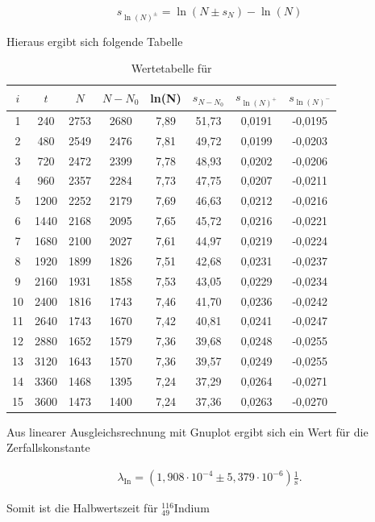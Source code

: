 \begin{equation}
 s_{\ln(N)^{\pm}} = \ln(N\pm s_N)-\ln(N)
\end{equation}

Hieraus ergibt sich folgende Tabelle

\renewcommand{\arraystretch}{1.25}
\begin{table}[h]
 \begin{tabular}{c|c|c|c|c|c|c|c}
 $i$ & $t$ & $N$ & $N-N_0$ & ln(N) & $s_{N-N_0}$ & $s_{\ln(N)^+}$ & $s_{\ln(N)^-}$ \\
 \hline
1&	240&	2753&	2680&	7,89&	51,73&	0,0191&	-0,0195\\
2&	480&	2549&	2476&	7,81&	49,72&	0,0199&	-0,0203\\
3&	720&	2472&	2399&	7,78&	48,93&	0,0202&	-0,0206\\
4&	960&	2357&	2284&	7,73&	47,75&	0,0207&	-0,0211\\
5&	1200&	2252&	2179&	7,69&	46,63&	0,0212&	-0,0216\\
6&	1440&	2168&	2095&	7,65&	45,72&	0,0216&	-0,0221\\
7&	1680&	2100&	2027&	7,61&	44,97&	0,0219&	-0,0224\\
8&	1920&	1899&	1826&	7,51&	42,68&	0,0231&	-0,0237\\
9&	2160&	1931&	1858&	7,53&	43,05&	0,0229&	-0,0234\\
10&	2400&	1816&	1743&	7,46&	41,70&	0,0236&	-0,0242\\
11&	2640&	1743&	1670&	7,42&	40,81&	0,0241&	-0,0247\\
12&	2880&	1652&	1579&	7,36&	39,68&	0,0248&	-0,0255\\
13&	3120&	1643&	1570&	7,36&	39,57&	0,0249&	-0,0255\\
14&	3360&	1468&	1395&	7,24&	37,29&	0,0264&	-0,0271\\
15&	3600&	1473&	1400&	7,24&	37,36&	0,0263&	-0,0270\\
\end{tabular}
\caption{Wertetabelle für }
\end{table}
\renewcommand{\arraystretch}{1}

Aus linearer Ausgleichsrechnung mit Gnuplot ergibt sich ein Wert für die Zerfallskonstante 

\begin{align}
\lambda_{\text{In}} = (1,908 \cdot 10^{-4} \pm 5,379 \cdot 10^{-6}) \frac{1}{\text{s}}.
\end{align}

Somit ist die Halbwertszeit für $^{116}_{49}$Indium


